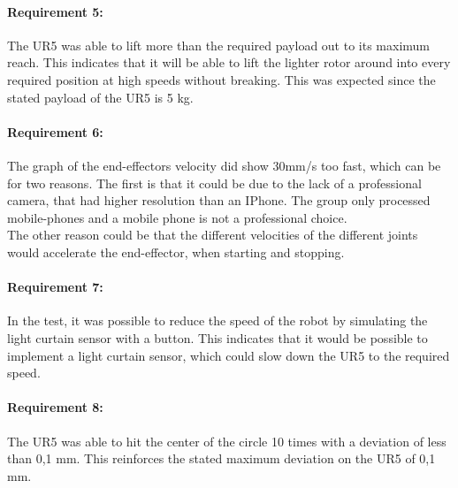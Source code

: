 \paragraph{Requirement 5:}
The UR5 was able to lift more than the required payload out to its maximum reach. This indicates that it will be able to lift the lighter rotor around into every required position at high speeds without breaking. This was expected since the stated payload of the UR5 is 5 kg. 


\paragraph{Requirement 6:}
The graph of the end-effectors velocity did show 30mm/s too fast, which can be for  two reasons. The first is that it could be due to the lack of a professional camera, that had higher resolution than an IPhone. The group only processed mobile-phones and a mobile phone is not a professional choice.\\
The other reason could be that the different velocities of the different joints would accelerate the end-effector, when starting and stopping. 


\paragraph{Requirement 7:}
In the test, it was possible to reduce the speed of the robot by simulating the light curtain sensor with a button. This indicates that it would be possible to implement a light curtain sensor, which could slow down the UR5 to the required speed. 


\paragraph{Requirement 8:}
The UR5 was able to hit the center of the circle 10 times with a deviation of less than 0,1 mm. This reinforces the stated maximum deviation on the UR5 of 0,1 mm. 
 

 